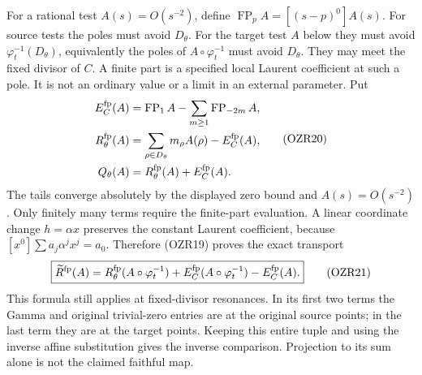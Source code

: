 \documentclass[
  10pt,
  a4paper,
]{article}
\begin{document}
For a rational test \(A(s)=O(s^{-2})\), define
\(\operatorname{FP}_p A=[(s-p)^0]A(s)\). For source tests the poles must
avoid \(D_\theta\). For the target test \(A\) below they must avoid
\(\varphi_t^{-1}(D_\theta)\), equivalently the poles of
\(A\circ\varphi_t^{-1}\) must avoid \(D_\theta\). They may meet the
fixed divisor of \(C\). A finite part is a specified local Laurent
coefficient at such a pole. It is not an ordinary value or a limit in an
external parameter. Put \[
\begin{aligned}
E_C^{\rm fp}(A)&=\operatorname{FP}_1A
 -\sum_{m\ge1}\operatorname{FP}_{-2m}A,\\
R_\theta^{\rm fp}(A)&=\sum_{\rho\in D_\theta}m_\rho A(\rho)
 -E_C^{\rm fp}(A),\\
Q_\theta(A)&=R_\theta^{\rm fp}(A)+E_C^{\rm fp}(A).
\end{aligned}\tag{OZR20}
\] The tails converge absolutely by the displayed zero bound and
\(A(s)=O(s^{-2})\). Only finitely many terms require the finite-part
evaluation. A linear coordinate change \(h=\alpha x\) preserves the
constant Laurent coefficient, because \([x^0]\sum a_j\alpha^jx^j=a_0\).
Therefore (OZR19) proves the exact transport \[
\boxed{\widetilde R^{\rm fp}(A)=
R_\theta^{\rm fp}(A\circ\varphi_t^{-1})
 +E_C^{\rm fp}(A\circ\varphi_t^{-1})-E_C^{\rm fp}(A).}
\tag{OZR21}
\] This formula still applies at fixed-divisor resonances. In its first
two terms the Gamma and original trivial-zero entries are at the
original source points; in the last term they are at the target points.
Keeping this entire tuple and using the inverse affine substitution
gives the inverse comparison. Projection to its sum alone is not the
claimed faithful map.
\end{document}
